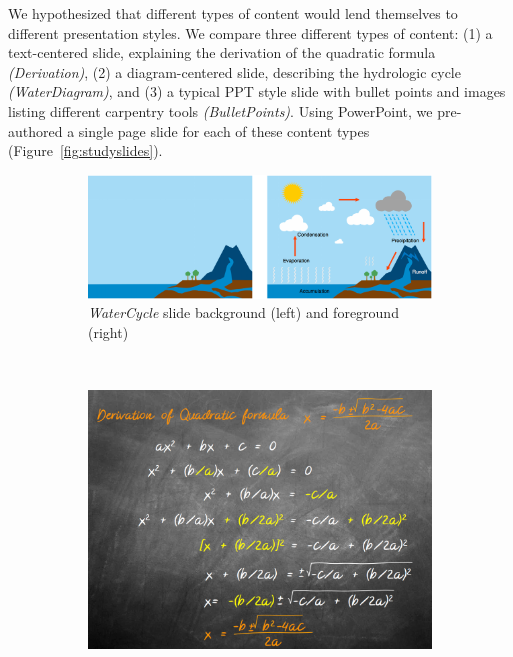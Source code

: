 We hypothesized that different types of content would lend themselves to different presentation styles. We compare three different types of content: (1) a text-centered slide, explaining the derivation of the quadratic formula \textit{(Derivation)}, (2) a diagram-centered slide, describing the hydrologic cycle  \textit{(WaterDiagram)}, and (3) a typical PPT style slide with bullet points and images listing different carpentry tools \textit{(BulletPoints)}. Using PowerPoint, we pre-authored a single page slide for each of these content types (Figure~\ref{fig:studyslides}).\\
%
\begin{figure}[h!]
    \centering
    \begin{subfigure}[t]{1\columnwidth}
        \centering
        \includegraphics[width=1\columnwidth]{figures/watercycle}
        \captionsetup{font=footnotesize}\caption{\textit{WaterCycle} slide background (left) and foreground (right)}
    \end{subfigure}
    ~ 
    \begin{subfigure}[t]{0.48\columnwidth}
        \centering
        \includegraphics[width=1\columnwidth]{figures/quadformula}

\end{subfigure}
\end{figure}
